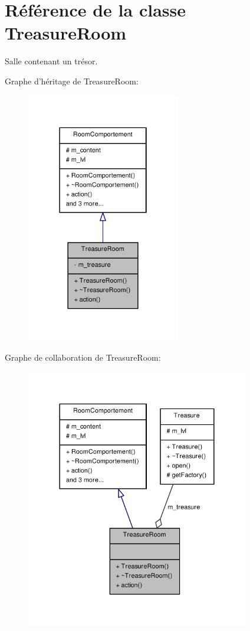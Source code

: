 \hypertarget{class_treasure_room}{\section{Référence de la classe Treasure\-Room}
\label{class_treasure_room}
}


Salle contenant un trésor.  




Graphe d'héritage de Treasure\-Room\-:
\nopagebreak
\begin{figure}[H]
\begin{center}
\leavevmode
\includegraphics[width=190pt]{class_treasure_room__inherit__graph}
\end{center}
\end{figure}


Graphe de collaboration de Treasure\-Room\-:
\nopagebreak
\begin{figure}[H]
\begin{center}
\leavevmode
\includegraphics[width=276pt]{class_treasure_room__coll__graph}
\end{center}
\end{figure}
